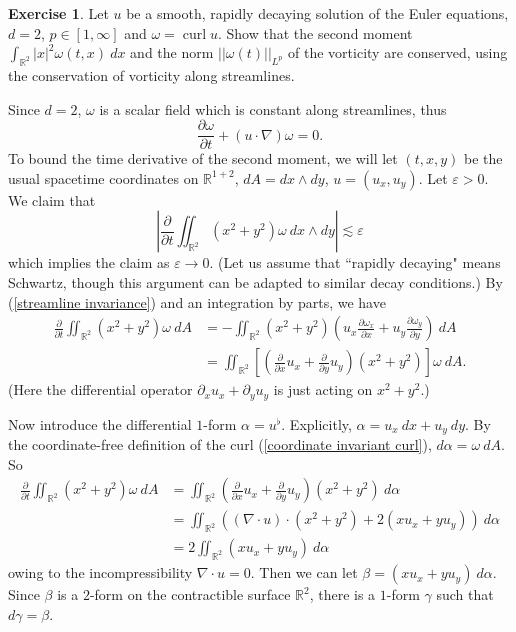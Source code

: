 \documentclass[10pt]{article}
\newcommand{\RR}{\mathbb{R}}
\DeclareMathOperator{\curl}{curl}
\theoremstyle{definition}
\newtheorem{exer}{Exercise}
\begin{document}
\begin{exer}
Let $u$ be a smooth, rapidly decaying solution of the Euler equations, $d = 2$, $p \in [1, \infty]$ and $\omega = \curl u$.
Show that the second moment $\int_{\RR^2} |x|^2 \omega(t, x) ~dx$ and the norm $||\omega(t)||_{L^p}$ of the vorticity are conserved, using the conservation of vorticity along streamlines.
\end{exer}

Since $d = 2$, $\omega$ is a scalar field which is constant along streamlines, thus
\begin{equation}
\label{streamline invariance}
\frac{\partial \omega}{\partial t} + (u \cdot \nabla)\omega = 0.
\end{equation}
To bound the time derivative of the second moment, we will let $(t, x, y)$ be the usual spacetime coordinates on $\RR^{1+2}$, $dA = dx \wedge dy$, $u = (u_x, u_y)$.
Let $\varepsilon > 0$.
We claim that
\begin{equation}
\label{second moment changes slowly}
\left|\frac{\partial}{\partial t} \iint_{\RR^2} (x^2 + y^2) \omega ~dx \wedge dy\right| \lesssim \varepsilon
\end{equation}
which implies the claim as $\varepsilon \to 0$.
(Let us assume that ``rapidly decaying" means Schwartz, though this argument can be adapted to similar decay conditions.)
By (\ref{streamline invariance}) and an integration by parts, we have
\begin{align*}
\frac{\partial}{\partial t} \iint_{\RR^2} (x^2 + y^2) \omega ~dA &=
-\iint_{\RR^2} (x^2 + y^2)\left(u_x \frac{\partial \omega_x}{\partial x} + u_y \frac{\partial \omega_y}{\partial y}\right) ~dA\\
&= \iint_{\RR^2} \left[\left(\frac{\partial}{\partial x} u_x + \frac{\partial}{\partial y} u_y\right)(x^2 + y^2)\right] \omega~dA.
\end{align*}
(Here the differential operator $\partial_x u_x + \partial_y u_y$ is just acting on $x^2 + y^2$.)

Now introduce the differential $1$-form $\alpha = u^\flat$. Explicitly, $\alpha = u_x ~dx + u_y ~dy$.
By the coordinate-free definition of the curl (\ref{coordinate invariant curl}), $d\alpha = \omega ~dA$.
So
\begin{align*}
\frac{\partial}{\partial t} \iint_{\RR^2} (x^2 + y^2) \omega ~dA &= \iint_{\RR^2} \left(\frac{\partial}{\partial x} u_x + \frac{\partial}{\partial y} u_y\right)(x^2 + y^2) ~d\alpha\\
&= \iint_{\RR^2} \left((\nabla \cdot u)\cdot(x^2 + y^2) + 2(xu_x + yu_y)\right) ~d\alpha\\
&= 2\iint_{\RR^2} (xu_x + yu_y) ~d\alpha
\end{align*}
owing to the incompressibility $\nabla \cdot u = 0$.
Then we can let $\beta = (xu_x + yu_y) ~d\alpha$.
Since $\beta$ is a $2$-form on the contractible surface $\RR^2$, there is a $1$-form $\gamma$ such that $d\gamma = \beta$.
\end{document}
